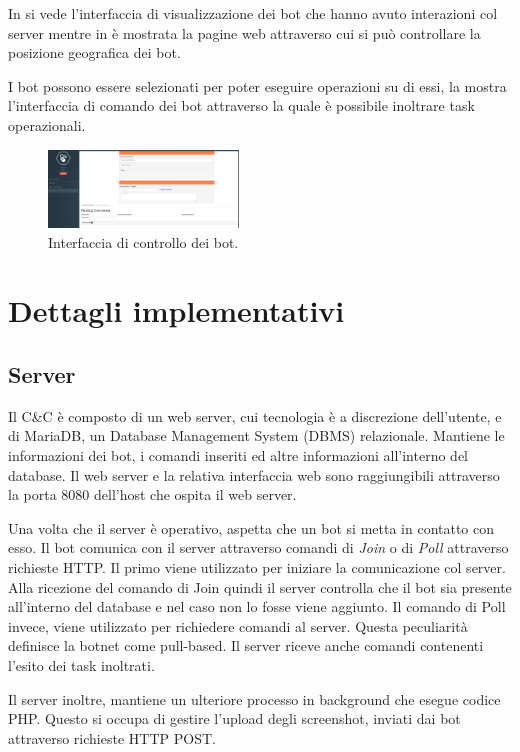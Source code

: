 In  si vede l'interfaccia di visualizzazione dei bot che hanno avuto interazioni col server mentre in  è mostrata la pagine web attraverso cui si può controllare la posizione geografica dei bot.

I bot possono essere selezionati per poter eseguire operazioni su di essi, la  mostra l'interfaccia di comando dei bot attraverso la quale è possibile inoltrare task operazionali.
\begin{figure}[hbtp]
    \centering
    \includegraphics[width=0.45\textwidth]{res/fig/uboat-control.png}
    \caption{Interfaccia di controllo dei bot.}
    \label{fig:uboat-control}
\end{figure}

\section{Dettagli implementativi}

\subsection{Server}
Il C\&C è composto di un web server, cui tecnologia è   a discrezione dell'utente, e di MariaDB, un Database Management System (DBMS) relazionale.
Mantiene le informazioni dei bot, i comandi inseriti ed altre informazioni all'interno del database. Il web server e la relativa interfaccia web sono  raggiungibili attraverso la porta 8080 dell'host che ospita il web server.

Una volta che il server è operativo, aspetta che un bot si metta in contatto con esso.
Il bot comunica con il server attraverso comandi di \textit{Join} o di \textit{Poll} attraverso richieste HTTP. Il primo viene utilizzato per iniziare la comunicazione col server. Alla ricezione del comando di Join quindi il server controlla che il bot sia presente all'interno del database e nel caso non lo fosse viene aggiunto. Il comando di Poll invece, viene utilizzato per richiedere comandi al server. Questa peculiarità  definisce la botnet come pull-based.
Il server riceve anche comandi contenenti l'esito dei task inoltrati.


Il server inoltre,  mantiene un ulteriore processo in background che esegue codice PHP. Questo   si occupa di gestire l'upload degli screenshot, inviati dai bot attraverso richieste HTTP POST.
